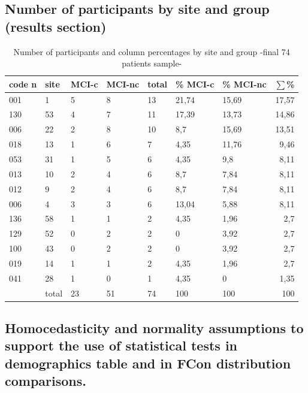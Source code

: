 	\subsection{Number of participants by site and group (results section)}\label{centres_resultats_74pacients}
		\FloatBarrier
		\begin{table}[h]
		\centering
		\begin{threeparttable}
			\caption{Number of participants and column percentages by site and group -final 74 patients sample-}
			\label{table:centres_en_mostrafinal_74 pacients}
			\begin{tabular}{ll|lll|llr}
				\toprule
				code n&site &MCI-c&MCI-nc&total&\% MCI-c&\% MCI-nc & $\sum$\%\\
				\midrule
				001&1&5&8&13&21,74&15,69&17,57\\
				130&53&4&7&11&17,39&13,73&14,86\\
				006&22&2&8&10&8,7&15,69&13,51\\
				018&13&1&6&7&4,35&11,76&9,46\\
				053&31&1&5&6&4,35&9,8&8,11\\
				013&10&2&4&6&8,7&7,84&8,11\\
				012&9&2&4&6&8,7&7,84&8,11\\
				006&4&3&3&6&13,04&5,88&8,11\\
				136&58&1&1&2&4,35&1,96&2,7\\
				129&52&0&2&2&0&3,92&2,7\\
				100&43&0&2&2&0&3,92&2,7\\
				019&14&1&1&2&4,35&1,96&2,7\\
				041&28&1&0&1&4,35&0&1,35\\
				\bottomrule
				&total&23&51&74&100&100&100\\
				\bottomrule
			\end{tabular}
			
		\end{threeparttable}
	\end{table}
	
	
	
	

	\FloatBarrier
	
	
	
	\subsection{Homocedasticity and normality assumptions to support the use of statistical tests in demographics table and in FCon distribution comparisons.} \label{taula_levene_shapiro_demografics} 
	
